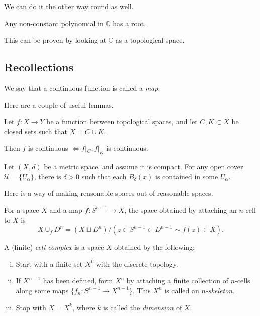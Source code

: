 \documentclass[12pt]{article}
\begin{document}
We can do it the other way round as well.

\begin{theorem}
	Any non-constant polynomial in $\mathbb{C}$ has a root.
\end{theorem}

This can be proven by looking at $\mathbb{C}$ as a topological space.

\subsection{Recollections}
\label{sub:rec}

We say that a continuous function is called a \emph{map}.

Here are a couple of useful lemmas.

\begin{lemma}
	Let $f : X \to Y$ be a function between topological spaces, and let $C, K \subset X$ be closed sets such that $X = C \cup K$.

	Then $f$ is continuous $\iff f|_C, f|_K$ is continuous.
\end{lemma}

\begin{lemma}
	Let $(X, d)$ be a metric space, and assume it is compact. For any open cover $\mathcal{U} = \{U_\alpha\}$, there is $\delta > 0$ such that each $B_\delta(x)$ is contained in some $U_\alpha$.
\end{lemma}

Here is a way of making reasonable spaces out of reasonable spaces.

\begin{definition}
	For a space $X$ and a map $f : S^{n-1} \to X$, the space obtained by attaching an $n$-cell to $X$ is
	\[
	X \cup_{f} D^n = (X \sqcup D^n) / (z \in S^{n-1} \subset D^{n-1} \sim f(z) \in X).
	\]
\end{definition}

\begin{definition}
	A (finite) \emph{cell complex} is a space $X$ obtained by the following:
	\begin{enumerate}[(i)]
		\item Start with a finite set $X^0$ with the discrete topology.
		\item If $X^{n-1}$ has been defined, form $X^n$ by attaching a finite collection of $n$-cells along some maps $\{f_n : S^{n-1} \to X^{n-1}\}$. This $X^n$ is called an \emph{$n$-skeleton}.
		\item Stop with $X = X^k$, where $k$ is called the \emph{dimension} of $X$.
	\end{enumerate}
\end{definition}
\end{document}
